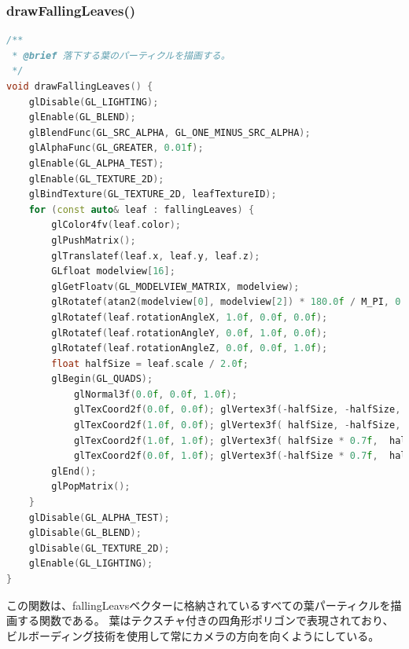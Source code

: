 \documentclass[uplatex,dvipdfmx,a4paper]{jsarticle}
\begin{document}
\hypertarget{func:drawFallingLeaves}{}\subsubsection{drawFallingLeaves()}\label{func:drawFallingLeaves}
\begin{lstlisting}[language=C++, caption={drawFallingLeaves() 関数}, label={lst:drawFallingLeaves_detail}]
/**
 * @brief 落下する葉のパーティクルを描画する。
 */
void drawFallingLeaves() {
    glDisable(GL_LIGHTING);
    glEnable(GL_BLEND);
    glBlendFunc(GL_SRC_ALPHA, GL_ONE_MINUS_SRC_ALPHA);
    glAlphaFunc(GL_GREATER, 0.01f);
    glEnable(GL_ALPHA_TEST);
    glEnable(GL_TEXTURE_2D);
    glBindTexture(GL_TEXTURE_2D, leafTextureID);
    for (const auto& leaf : fallingLeaves) {
        glColor4fv(leaf.color);
        glPushMatrix();
        glTranslatef(leaf.x, leaf.y, leaf.z);
        GLfloat modelview[16];
        glGetFloatv(GL_MODELVIEW_MATRIX, modelview);
        glRotatef(atan2(modelview[0], modelview[2]) * 180.0f / M_PI, 0.0f, 1.0f, 0.0f);
        glRotatef(leaf.rotationAngleX, 1.0f, 0.0f, 0.0f);
        glRotatef(leaf.rotationAngleY, 0.0f, 1.0f, 0.0f);
        glRotatef(leaf.rotationAngleZ, 0.0f, 0.0f, 1.0f);
        float halfSize = leaf.scale / 2.0f;
        glBegin(GL_QUADS);
            glNormal3f(0.0f, 0.0f, 1.0f);
            glTexCoord2f(0.0f, 0.0f); glVertex3f(-halfSize, -halfSize, 0.0f);
            glTexCoord2f(1.0f, 0.0f); glVertex3f( halfSize, -halfSize, 0.0f);
            glTexCoord2f(1.0f, 1.0f); glVertex3f( halfSize * 0.7f,  halfSize, 0.0f);
            glTexCoord2f(0.0f, 1.0f); glVertex3f(-halfSize * 0.7f,  halfSize, 0.0f);
        glEnd();
        glPopMatrix();
    }
    glDisable(GL_ALPHA_TEST);
    glDisable(GL_BLEND);
    glDisable(GL_TEXTURE_2D);
    glEnable(GL_LIGHTING);
}
\end{lstlisting}
この関数は、fallingLeavsベクターに格納されているすべての葉パーティクルを描画する関数である。
葉はテクスチャ付きの四角形ポリゴンで表現されており、ビルボーディング技術を使用して常にカメラの方向を向くようにしている。
\end{document}

